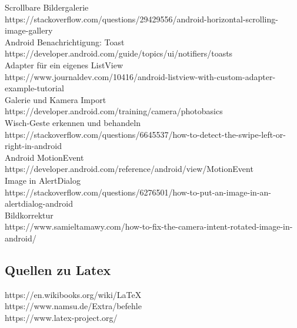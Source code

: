 Scrollbare Bildergalerie\\
https://stackoverflow.com/questions/29429556/android-horizontal-scrolling-image-gallery\\
Android Benachrichtigung: Toast\\
https://developer.android.com/guide/topics/ui/notifiers/toasts\\
Adapter für ein eigenes ListView\\
https://www.journaldev.com/10416/android-listview-with-custom-adapter-example-tutorial\\
Galerie und Kamera Import\\
https://developer.android.com/training/camera/photobasics\\
Wisch-Geste erkennen und behandeln\\
https://stackoverflow.com/questions/6645537/how-to-detect-the-swipe-left-or-right-in-android\\
Android MotionEvent\\
https://developer.android.com/reference/android/view/MotionEvent\\
Image in AlertDialog\\
https://stackoverflow.com/questions/6276501/how-to-put-an-image-in-an-alertdialog-android\\
Bildkorrektur\\
https://www.samieltamawy.com/how-to-fix-the-camera-intent-rotated-image-in-android/\\


\subsection{Quellen zu Latex}

https://en.wikibooks.org/wiki/LaTeX\\
https://www.namsu.de/Extra/befehle\\
https://www.latex-project.org/\\



